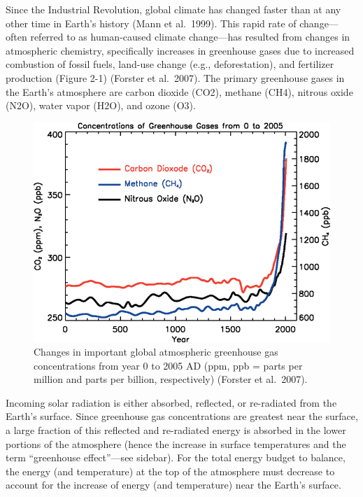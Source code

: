 \documentclass[
  letterpaper,
]{scrreprt}\usepackage{amsmath,amssymb}
\begin{document}
Since the Industrial Revolution, global climate has changed faster than
at any other time in Earth's history (Mann et al.~1999). This rapid rate
of change---often referred to as human-caused climate change---has
resulted from changes in atmospheric chemistry, specifically increases
in greenhouse gases due to increased combustion of fossil fuels,
land-use change (e.g., deforestation), and fertilizer production (Figure
2-1) (Forster et al.~2007). The primary greenhouse gases in the Earth's
atmosphere are carbon dioxide (CO2), methane (CH4), nitrous oxide (N2O),
water vapor (H2O), and ozone (O3).

\begin{figure}

{\centering \includegraphics{./assets/ghg-emissions.png}

}

\caption{\label{fig-ghg}Changes in important global atmospheric
greenhouse gas concentrations from year 0 to 2005 AD (ppm, ppb = parts
per million and parts per billion, respectively) (Forster et al.~2007).}

\end{figure}

Incoming solar radiation is either absorbed, reflected, or re-radiated
from the Earth's surface. Since greenhouse gas concentrations are
greatest near the surface, a large fraction of this reflected and
re-radiated energy is absorbed in the lower portions of the atmosphere
(hence the increase in surface temperatures and the term ``greenhouse
effect''---see sidebar). For the total energy budget to balance, the
energy (and temperature) at the top of the atmosphere must decrease to
account for the increase of energy (and temperature) near the Earth's
surface.
\end{document}
